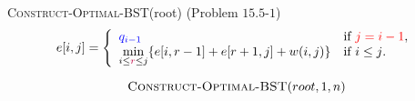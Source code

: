 
\begin{frame}
  \begin{exampleblock}{\textsc{Construct-Optimal-BST}(root) (Problem $15.5$-$1$)}
    \[ 
      e[i,j] = \left\{ \begin{array}{ll}
	\textcolor{blue}{q_{i-1}} 	& \mbox{if \textcolor{red}{$j = i-1$}}, \\
	\min\limits_{i \le \textcolor{purple}{r} \le j} \{e[i, r-1] + e[r+1, j] + w(i,j) \}    & \mbox{if $i \le j$}.
      \end{array} \right. 
    \] 
  \end{exampleblock}

  \pause
  

  \pause
  \vspace{-0.50cm}
  \[
    \textsc{Construct-Optimal-BST}(root, 1, n)
  \]
\end{frame}
